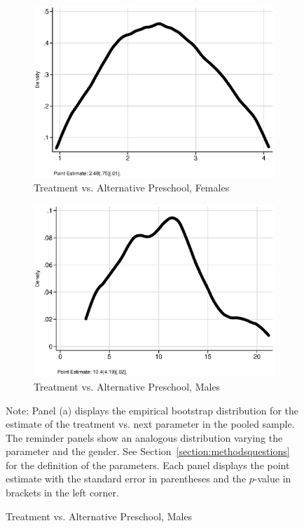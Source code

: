 \begin{figure}
\begin{subfigure}[h]{0.25\textwidth}
\end{subfigure}%
\begin{subfigure}[h]{0.25\textwidth}
	\centering
	\caption{Treatment vs. Alternative Preschool, Females}
		\includegraphics[width=\textwidth]{output/ratios_8_sexf.eps}
\end{subfigure}%
\begin{subfigure}[h]{0.25\textwidth}
	\centering
	\caption{Treatment vs. Alternative Preschool, Males}
		\includegraphics[width=\textwidth]{output/ratios_8_sexm.eps}
\end{subfigure}
\footnotesize \justify
Note: Panel (a) displays the empirical bootstrap distribution for the estimate of the treatment vs. next parameter in the pooled sample. The reminder panels show an analogous distribution varying the parameter and the gender. See Section~\ref{section:methodsquestions} for the definition of the parameters. Each panel displays the point estimate with the standard error in parentheses and the $p$-value in brackets in the left corner.
\end{figure}
\restoregeometry
\doublespacing

